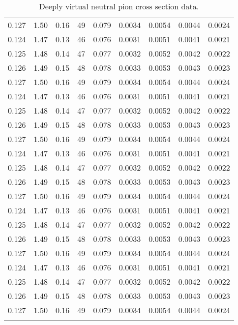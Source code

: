 \begin{longtable}{|c|c|c|c|c|c|c|c|c|}
    0.127 & 1.50 & 0.16 & 49 & 0.079 & 0.0034 & 0.0054 & 0.0044 & 0.0024 \\
        0.124 & 1.47 & 0.13 & 46 & 0.076 & 0.0031 & 0.0051 & 0.0041 & 0.0021 \\
    0.125 & 1.48 & 0.14 & 47 & 0.077 & 0.0032 & 0.0052 & 0.0042 & 0.0022 \\
    0.126 & 1.49 & 0.15 & 48 & 0.078 & 0.0033 & 0.0053 & 0.0043 & 0.0023 \\
    0.127 & 1.50 & 0.16 & 49 & 0.079 & 0.0034 & 0.0054 & 0.0044 & 0.0024 \\
        0.124 & 1.47 & 0.13 & 46 & 0.076 & 0.0031 & 0.0051 & 0.0041 & 0.0021 \\
    0.125 & 1.48 & 0.14 & 47 & 0.077 & 0.0032 & 0.0052 & 0.0042 & 0.0022 \\
    0.126 & 1.49 & 0.15 & 48 & 0.078 & 0.0033 & 0.0053 & 0.0043 & 0.0023 \\
    0.127 & 1.50 & 0.16 & 49 & 0.079 & 0.0034 & 0.0054 & 0.0044 & 0.0024 \\
        0.124 & 1.47 & 0.13 & 46 & 0.076 & 0.0031 & 0.0051 & 0.0041 & 0.0021 \\
    0.125 & 1.48 & 0.14 & 47 & 0.077 & 0.0032 & 0.0052 & 0.0042 & 0.0022 \\
    0.126 & 1.49 & 0.15 & 48 & 0.078 & 0.0033 & 0.0053 & 0.0043 & 0.0023 \\
    0.127 & 1.50 & 0.16 & 49 & 0.079 & 0.0034 & 0.0054 & 0.0044 & 0.0024 \\
        0.124 & 1.47 & 0.13 & 46 & 0.076 & 0.0031 & 0.0051 & 0.0041 & 0.0021 \\
    0.125 & 1.48 & 0.14 & 47 & 0.077 & 0.0032 & 0.0052 & 0.0042 & 0.0022 \\
    0.126 & 1.49 & 0.15 & 48 & 0.078 & 0.0033 & 0.0053 & 0.0043 & 0.0023 \\
    0.127 & 1.50 & 0.16 & 49 & 0.079 & 0.0034 & 0.0054 & 0.0044 & 0.0024 \\
        0.124 & 1.47 & 0.13 & 46 & 0.076 & 0.0031 & 0.0051 & 0.0041 & 0.0021 \\
    0.125 & 1.48 & 0.14 & 47 & 0.077 & 0.0032 & 0.0052 & 0.0042 & 0.0022 \\
    0.126 & 1.49 & 0.15 & 48 & 0.078 & 0.0033 & 0.0053 & 0.0043 & 0.0023 \\
    0.127 & 1.50 & 0.16 & 49 & 0.079 & 0.0034 & 0.0054 & 0.0044 & 0.0024 \\
    \hline
    \caption{Deeply virtual neutral pion cross section data.}
    \label{tab:full_xsec_data_table}
    \end{longtable}
    